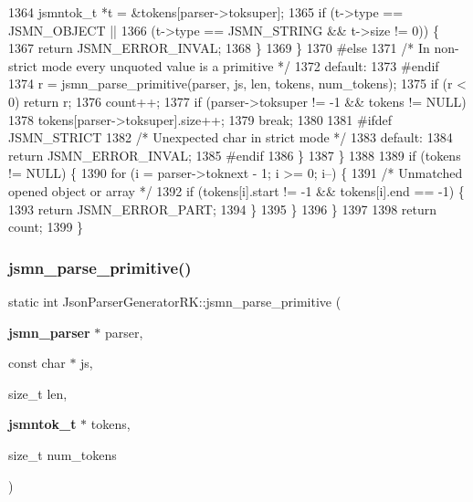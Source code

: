 \begin{DoxyCode}
1364                     jsmntok\_t *t = &tokens[parser->toksuper];
1365                     \textcolor{keywordflow}{if} (t->type == JSMN_OBJECT ||
1366                             (t->type == JSMN_STRING && t->size != 0)) \{
1367                         \textcolor{keywordflow}{return} JSMN_ERROR_INVAL;
1368                     \}
1369                 \}
1370 \textcolor{preprocessor}{#else}
1371             \textcolor{comment}{/* In non-strict mode every unquoted value is a primitive */}
1372             \textcolor{keywordflow}{default}:
1373 \textcolor{preprocessor}{#endif}
1374                 r = jsmn_parse_primitive(parser, js, len, tokens, num\_tokens);
1375                 \textcolor{keywordflow}{if} (r < 0) \textcolor{keywordflow}{return} r;
1376                 count++;
1377                 \textcolor{keywordflow}{if} (parser->toksuper != -1 && tokens != NULL)
1378                     tokens[parser->toksuper].size++;
1379                 \textcolor{keywordflow}{break};
1380 
1381 \textcolor{preprocessor}{#ifdef JSMN\_STRICT}
1382             \textcolor{comment}{/* Unexpected char in strict mode */}
1383             \textcolor{keywordflow}{default}:
1384                 \textcolor{keywordflow}{return} JSMN_ERROR_INVAL;
1385 \textcolor{preprocessor}{#endif}
1386         \}
1387     \}
1388 
1389     \textcolor{keywordflow}{if} (tokens != NULL) \{
1390         \textcolor{keywordflow}{for} (i = parser->toknext - 1; i >= 0; i--) \{
1391             \textcolor{comment}{/* Unmatched opened object or array */}
1392             \textcolor{keywordflow}{if} (tokens[i].start != -1 && tokens[i].end == -1) \{
1393                 \textcolor{keywordflow}{return} JSMN_ERROR_PART;
1394             \}
1395         \}
1396     \}
1397 
1398     \textcolor{keywordflow}{return} count;
1399 \}
\end{DoxyCode}
\mbox{\label{namespace_json_parser_generator_r_k_aee5a37badfbb7bed92ca662a733fde8f}} 
\subsubsection{jsmn\+\_\+parse\+\_\+primitive()}
{\footnotesize\ttfamily static int Json\+Parser\+Generator\+R\+K\+::jsmn\+\_\+parse\+\_\+primitive (\begin{DoxyParamCaption}\item[{\textbf{ jsmn\+\_\+parser} $\ast$}]{parser,  }\item[{const char $\ast$}]{js,  }\item[{size\+\_\+t}]{len,  }\item[{\textbf{ jsmntok\+\_\+t} $\ast$}]{tokens,  }\item[{size\+\_\+t}]{num\+\_\+tokens }\end{DoxyParamCaption})\hspace{0.3cm}{\ttfamily [static]}}

